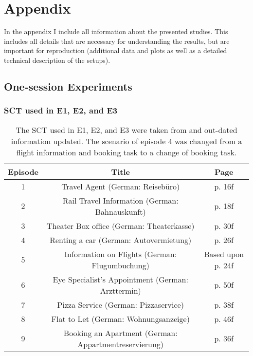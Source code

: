 \chapter{Appendix}\label{chap:appendix}
\begin{chapter-abstract}
In the appendix I include all information about the presented studies.
This includes all details that are necessary for understanding the results, but are important for reproduction (additional data and plots as well as a detailed technical description of the setups).
\end{chapter-abstract}


\section{One-session Experiments}

\subsection{\acs{SCT} used in E1, E2, and E3}
\begin{table}[h]
	\centering
	\begin{tabular}{c|c|c}
	Episode & Title & Page \\
	\hline
	1 & Travel Agent (German: Reisebüro) & p. 16f \\
	2 & Rail Travel Information (German: Bahnauskunft) & p. 18f \\
	3 & Theater Box office (German: Theaterkasse) & p. 30f \\
	4 & Renting a car (German: Autovermietung) & p. 26f \\
	5 & Information on Flights (German: Flugumbuchung) & Based upon p. 24f \\
	6 & Eye Specialist's Appointment (German: Arzttermin) & p. 50f \\
	7 & Pizza Service (German: Pizzaservice) & p. 38f \\
	8 & Flat to Let (German: Wohnungsanzeige) & p. 46f \\
	9 & Booking an Apartment (German: Appartmentreservierung) & p. 36f \\
	\end{tabular}
	\caption{The \acs{SCT} used in E1, E2, and E3 were taken from \cite{itu-t_p.805:_2007} and out-dated information updated. The scenario of episode 4 was changed from a flight information and booking task to a change of booking task.}
	\label{tab:appendix:labsct}
\end{table}

